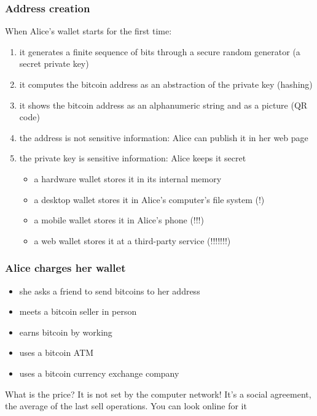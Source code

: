 \documentclass[11pt]{beamer}  %
\begin{document}
\begin{frame}\frametitle{Address creation}

  When Alice's wallet starts for the first time:

  \begin{enumerate}
  \item it generates a finite sequence of bits through a secure random generator
    (a secret private key)
  \item it computes the bitcoin address as an abstraction of the private key
    (hashing)
  \item it shows the bitcoin address as an alphanumeric string and as a picture (QR code)
  \item \alert{the address is not sensitive information}: Alice can publish it in her web page
  \item \alert{the private key is sensitive information}: Alice keeps it secret
    \begin{itemize}
    \item a hardware wallet stores it in its internal memory
    \item a desktop wallet stores it in Alice's computer's file system (!)
    \item a mobile wallet stores it in Alice's phone (!!!)
    \item a web wallet stores it at a third-party service (!!!!!!!)
    \end{itemize}
  \end{enumerate}
\end{frame}

\begin{frame}\frametitle{Alice charges her wallet}
  \begin{itemize}
  \item she asks a friend to send bitcoins to her address
  \item meets a bitcoin seller in person
  \item earns bitcoin by working
  \item uses a bitcoin ATM
  \item uses a bitcoin currency exchange company
  \end{itemize}

  \bigskip

  \begin{greenbox}{What is the price?}
    It is not set by the computer network! It's a social
    agreement, the average of the last sell operations.
    You can look online for it
  \end{greenbox}

\end{frame}
\end{document}

